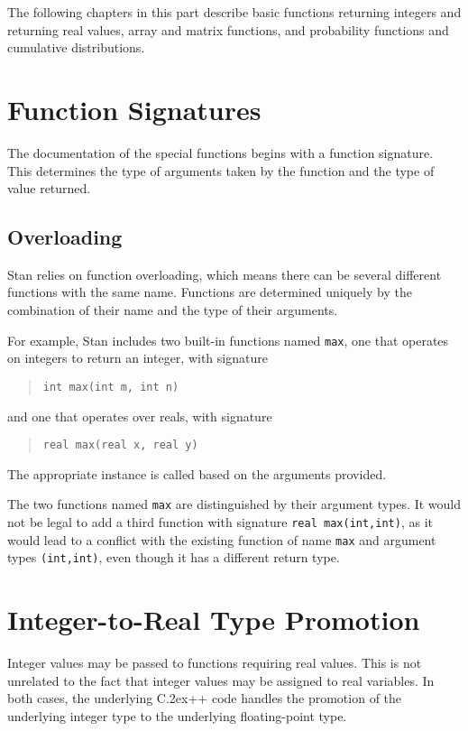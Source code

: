 \documentclass[10pt]{report}
\newcommand{\Stan}{Stan\xspace}
\newcommand*{\Cpp}{C\raise.2ex\hbox{\footnotesize ++}\xspace} %
\newcommand{\code}[1]{{\tt #1}}
\begin{document}
The following chapters in this part describe basic functions returning
integers and returning real values, array and matrix functions, and
probability functions and cumulative distributions.

\section{Function Signatures}

The documentation of the special functions begins with a function
signature.  This determines the type of arguments taken by the
function and the type of value returned.  

\subsection{Overloading}

\Stan relies on function overloading, which means there can be several
different functions with the same name.  Functions are determined
uniquely by the combination of their name and the type of their
arguments.

For example, \Stan includes two built-in functions named \code{max}, one that
operates on integers to return an integer, with signature
%
\begin{quote}
\begin{Verbatim}
int max(int m, int n)
\end{Verbatim}
\end{quote}
%
and one that operates over reals, with signature
%
\begin{quote}
\begin{Verbatim}
real max(real x, real y)
\end{Verbatim}
\end{quote}
%
The appropriate instance is called based on the arguments provided.

The two functions named \code{max} are distinguished by their argument
types.  It would not be legal to add a third function with signature
\code{real max(int,int)}, as it would lead to a conflict with the
existing function of name \code{max} and argument types
\code{(int,int)}, even though it has a different return type.


\section{Integer-to-Real Type Promotion}

Integer values may be passed to functions requiring real values.  This
is not unrelated to the fact that integer values may be assigned to
real variables.  In both cases, the underlying \Cpp code handles the
promotion of the underlying integer type to the underlying
floating-point type.
\end{document}
